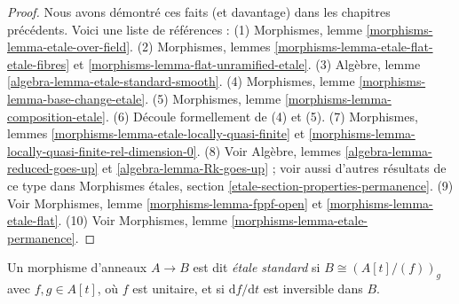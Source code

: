 \begin{proof}
Nous avons d\'emontr\'e ces faits (et davantage) dans les chapitres pr\'ec\'edents.
Voici une liste de r\'ef\'erences :
(1) Morphismes, lemme \ref{morphisms-lemma-etale-over-field}.
(2) Morphismes, lemmes \ref{morphisms-lemma-etale-flat-etale-fibres}
et \ref{morphisms-lemma-flat-unramified-etale}.
(3) Algèbre, lemme \ref{algebra-lemma-etale-standard-smooth}.
(4) Morphismes, lemme \ref{morphisms-lemma-base-change-etale}.
(5) Morphismes, lemme \ref{morphisms-lemma-composition-etale}.
(6) D\'ecoule formellement de (4) et (5).
(7) Morphismes, lemmes \ref{morphisms-lemma-etale-locally-quasi-finite}
et \ref{morphisms-lemma-locally-quasi-finite-rel-dimension-0}.
(8) Voir Algèbre, lemmes \ref{algebra-lemma-reduced-goes-up} et
\ref{algebra-lemma-Rk-goes-up} ; voir aussi d'autres r\'esultats de ce type
dans Morphismes étales, section \ref{etale-section-properties-permanence}.
(9) Voir Morphismes, lemme \ref{morphisms-lemma-fppf-open} et
\ref{morphisms-lemma-etale-flat}.
(10) Voir Morphismes, lemme \ref{morphisms-lemma-etale-permanence}.
\end{proof}

\begin{definition}
\label{definition-standard-etale}
Un morphisme d'anneaux $A \to B$ est dit {\it \'etale standard} si
$B \cong \left(A[t]/(f)\right)_g$ avec $f, g \in A[t]$, o\`u $f$ est unitaire,
et si $\text{d}f/\text{d}t$ est inversible dans $B$.
\end{definition}

